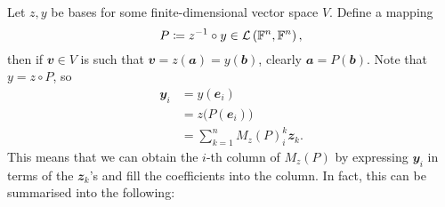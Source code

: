 \documentclass[math, code]{amznotes}
\theoremstyle{remark}
\begin{document}
Let $z, y$ be bases for some finite-dimensional vector space $V$. Define a mapping
\begin{equation*}
    P \coloneqq z^{-1} \circ y \in \mathcal{L}\left(\mathbb{F}^n, \mathbb{F}^n\right),
\end{equation*}
then if $\mathbfit{v} \in V$ is such that $\mathbfit{v} = z(\mathbfit{a}) = y(\mathbfit{b})$, clearly $\mathbfit{a} = P(\mathbfit{b})$. Note that $y = z \circ P$, so
\begin{align*}
    \mathbfit{y}_i & = y(\mathbfit{e}_i) \\
    & = z\bigl(P(\mathbfit{e}_i)\bigr) \\
    & = \sum_{k = 1}^{n}M_z(P)^k_i\mathbfit{z}_k.
\end{align*} 
This means that we can obtain the $i$-th column of $M_z(P)$ by expressing $\mathbfit{y}_i$ in terms of the $\mathbfit{z}_k$'s and fill the coefficients into the column. In fact, this can be summarised into the following:
\end{document}
